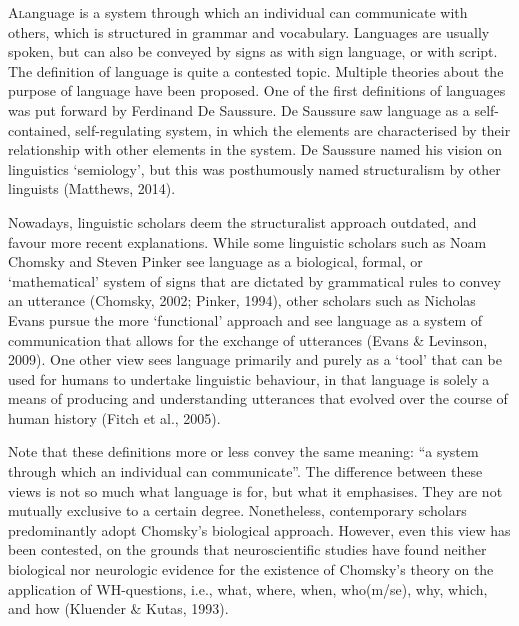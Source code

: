 \def\isy#1{\scalerel*{\texttt{[image: ./Images/\#1.jpg]}}{X}}


\lettrine{A} language is a system through which an individual can communicate with others, which is structured in grammar and vocabulary. Languages are usually spoken, but can also be conveyed by signs as with sign language, or with script. The definition of language is quite a contested topic. Multiple theories about the purpose of language have been proposed. One of the first definitions of languages was put forward by Ferdinand De Saussure. De Saussure saw language as a self-contained, self-regulating system, in which the elements are characterised by their relationship with other elements in the system. De Saussure named his vision on linguistics ‘semiology’, but this was posthumously named structuralism by other linguists (Matthews, 2014). 

Nowadays, linguistic scholars deem the structuralist approach outdated, and favour more recent explanations. While some linguistic scholars such as Noam Chomsky and Steven Pinker see language as a biological, formal, or ‘mathematical’ system of signs that are dictated by grammatical rules to convey an utterance (Chomsky, 2002; Pinker, 1994), other scholars such as Nicholas Evans pursue the more ‘functional’ approach and see language as a system of communication that allows for the exchange of utterances (Evans \& Levinson, 2009). One other view sees language primarily and purely as a ‘tool’ that can be used for humans to undertake linguistic behaviour, in that language is solely a means of producing and understanding utterances that evolved over the course of human history (Fitch et al., 2005). 

Note that these definitions more or less convey the same meaning: “a system through which an individual can communicate”. The difference between these views is not so much what language is for, but what it emphasises. They are not mutually exclusive to a certain degree. Nonetheless, contemporary scholars predominantly adopt Chomsky's biological approach. However, even this view has been contested, on the grounds that neuroscientific studies have found  neither biological nor neurologic evidence for the existence of Chomsky’s theory on the application of WH-questions, i.e., what, where, when, who(m/se), why, which, and how (Kluender \& Kutas, 1993). 

